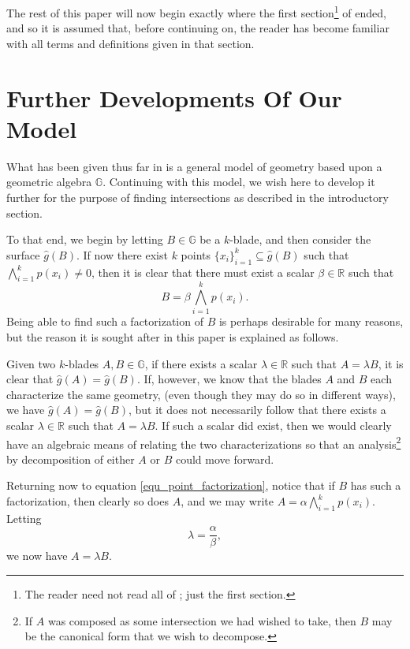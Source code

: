 \documentclass{birkjour}
\theoremstyle{definition}
\theoremstyle{remark}
\numberwithin{equation}{section}
\newcommand{\R}{\mathbb{R}}
\newcommand{\G}{\mathbb{G}}
\newcommand{\gh}{\hat{g}}
\begin{document}
The rest of this paper will now begin exactly where the first section\footnote{The reader
need not read all of \cite{}; just the first section.} of \cite{} ended, and
so it is assumed that, before continuing on, the reader has become familiar with
all terms and definitions given in that section.

\section{Further Developments Of Our Model}

What has been given thus far in \cite{} is a general model of geometry based upon
a geometric algebra $\G$.  Continuing with this model, we wish here to develop it
further for the purpose of finding intersections as described in the introductory section.

To that end, we begin by letting $B\in\G$ be a $k$-blade, and then consider the surface $\gh(B)$.
If now there exist $k$ points $\{x_i\}_{i=1}^k\subseteq\gh(B)$ such that $\bigwedge_{i=1}^k p(x_i)\neq 0$,
then it is clear that there must exist a scalar $\beta\in\R$ such that
\begin{equation}\label{equ_point_factorization}
B = \beta\bigwedge_{i=1}^k p(x_i).
\end{equation}
Being able to find such a factorization of $B$ is perhaps desirable for many reasons, but the
reason it is sought after in this paper is explained as follows.

Given two $k$-blades $A,B\in\G$, if there exists a scalar $\lambda\in\R$
such that $A=\lambda B$, it is clear that $\gh(A)=\gh(B)$.  If, however, we know that
the blades $A$ and $B$ each characterize the same geometry, (even though they may do so in different ways),
we have $\gh(A)=\gh(B)$, but it does not necessarily follow that there exists a
scalar $\lambda\in\R$ such that $A=\lambda B$.  If such a scalar did exist, then
we would clearly have an algebraic means of relating the two characterizations so that
an analysis\footnote{If $A$ was composed as some intersection we had wished to take,
then $B$ may be the canonical form
that we wish to decompose.} by decomposition of either $A$ or $B$ could move forward.

Returning now to equation \eqref{equ_point_factorization}, notice that if $B$ has
such a factorization, then clearly so does $A$, and we may write $A=\alpha\bigwedge_{i=1}^k p(x_i)$.
Letting
\begin{equation*}
\lambda=\frac{\alpha}{\beta},
\end{equation*}
we now have $A=\lambda B$.
\end{document}
